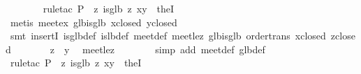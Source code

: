\begin{isabellebody}
\ \ \ \ \ \ \isamarkupfalse%
\ {}rule{}tac\ {}P\ {}\ {}{}z{}\ is{}glb\ z\ {}x{}y{}{}\ \ the{}I{}{}\isanewline
\ \ \ \ \ \ \isamarkupfalse%
\ {}metis\ meet{}ex\ glb{}is{}glb\ x{}closed\ y{}closed{}\isanewline
\ \ \ \ \ \ \isamarkupfalse%
\ {}smt\ insertI{}\ is{}glb{}def\ is{}lb{}def\ meet{}def\ meet{}le{}z\ glb{}is{}glb\ order{}trans\ x{}closed\ z{}closed{}\isanewline
\ \ \ \ \isamarkupfalse%
\ \isamarkupfalse%
\ {}z\ {}\ y{}\ \isamarkupfalse%
\ meet{}le{}z\isanewline
\ \ \ \ \ \ \isamarkupfalse%
\ {}simp\ add{}\ meet{}def\ glb{}def{}\isanewline
\ \ \ \ \ \ \isamarkupfalse%
\ {}rule{}tac\ {}P\ {}\ {}{}z{}\ is{}glb\ z\ {}x{}y{}{}\ \ the{}I{}{}\isanewline

\end{isabellebody}
